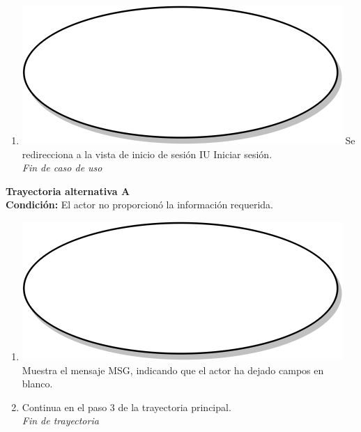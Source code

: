 \begin{enumerate}
  \item {\includegraphics[scale=.1]{Capitulo3/img/proceso.png} Se redirecciona a la vista de inicio de sesión IU Iniciar sesión.} \\
  \textit{Fin de caso de uso} \\	
\end{enumerate}

\textbf{Trayectoria alternativa A} \label{cu1_1_ta_a} \\
\textbf{Condición:} El actor no proporcionó la información requerida.\\
 \begin{enumerate}[label=A\arabic*]
    \item {\includegraphics[scale=.05]{Capitulo3/img/proceso.png} Muestra el mensaje MSG, indicando que el actor ha dejado campos en blanco.}
    \item {Continua en el paso 3 de la trayectoria principal.} \\
    \textit{Fin de trayectoria} \\
\end{enumerate}

